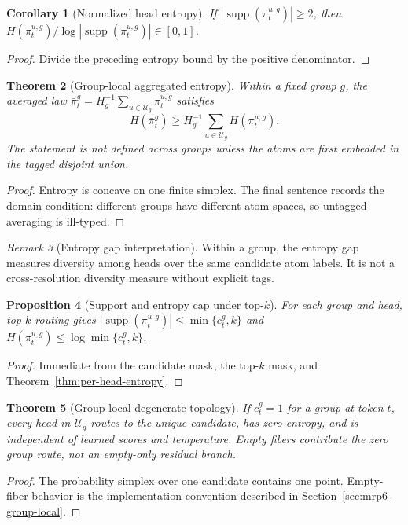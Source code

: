\documentclass{article}
\theoremstyle{plain}
\newtheorem{theorem}{Theorem}[section]
\newtheorem{proposition}[theorem]{Proposition}
\newtheorem{corollary}[theorem]{Corollary}
\theoremstyle{definition}
\theoremstyle{remark}
\newtheorem{remark}[theorem]{Remark}
\begin{document}
\begin{corollary}[Normalized head entropy]
\label{cor:normalized-head-entropy}
If $|\operatorname{supp}(\pi_t^{u,g})|\ge2$, then $H(\pi_t^{u,g})/\log |\operatorname{supp}(\pi_t^{u,g})|\in[0,1]$.
\end{corollary}
\begin{proof}
Divide the preceding entropy bound by the positive denominator.
\end{proof}

\begin{theorem}[Group-local aggregated entropy]
\label{thm:aggregated-vs-head-entropy}
Within a fixed group $g$, the averaged law $\bar\pi_t^g=H_g^{-1}\sum_{u\in\mathcal U_g}\pi_t^{u,g}$ satisfies
\begin{equation}
H(\bar\pi_t^g)\ge H_g^{-1}\sum_{u\in\mathcal U_g}H(\pi_t^{u,g}).
\end{equation}
The statement is not defined across groups unless the atoms are first embedded in the tagged disjoint union.
\end{theorem}
\begin{proof}
Entropy is concave on one finite simplex.  The final sentence records the domain condition: different groups have different atom spaces, so untagged averaging is ill-typed.
\end{proof}

\begin{remark}[Entropy gap interpretation]
\label{rem:entropy-gap-interpretation}
Within a group, the entropy gap measures diversity among heads over the same candidate atom labels.  It is not a cross-resolution diversity measure without explicit tags.
\end{remark}

\begin{proposition}[Support and entropy cap under top-$k$]
\label{prop:topk-support-entropy}
For each group and head, top-$k$ routing gives $|\operatorname{supp}(\pi_t^{u,g})|\le\min\{c_t^g,k\}$ and $H(\pi_t^{u,g})\le\log\min\{c_t^g,k\}$.
\end{proposition}
\begin{proof}
Immediate from the candidate mask, the top-$k$ mask, and Theorem~\ref{thm:per-head-entropy}.
\end{proof}

\begin{theorem}[Group-local degenerate topology]
\label{thm:degenerate-topology}
If $c_t^g=1$ for a group at token $t$, every head in $\mathcal U_g$ routes to the unique candidate, has zero entropy, and is independent of learned scores and temperature.  Empty fibers contribute the zero group route, not an empty-only residual branch.
\end{theorem}
\begin{proof}
The probability simplex over one candidate contains one point.  Empty-fiber behavior is the implementation convention described in Section~\ref{sec:mrp6-group-local}.
\end{proof}
\end{document}
